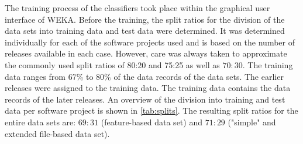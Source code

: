 The training process of the classifiers took place within the graphical user interface of WEKA. Before the training, the split ratios for the division of the data sets into training data and test data were determined. It was determined individually for each of the software projects used and is based on the number of releases available in each case. However, care was always taken to approximate the commonly used split ratios of 80:20 and 75:25 as well as $70:30$. The training data ranges from $67\%$ to $80\%$ of the data records of the data sets. The earlier releases were assigned to the training data. The training data contains the data records of the later releases. An overview of the division into training and test data per software project is shown in \autoref{tab:splits}. The resulting split ratios for the entire data sets are: $69:31$ (feature-based data set) and $71:29$ ("simple" and extended file-based data set).

